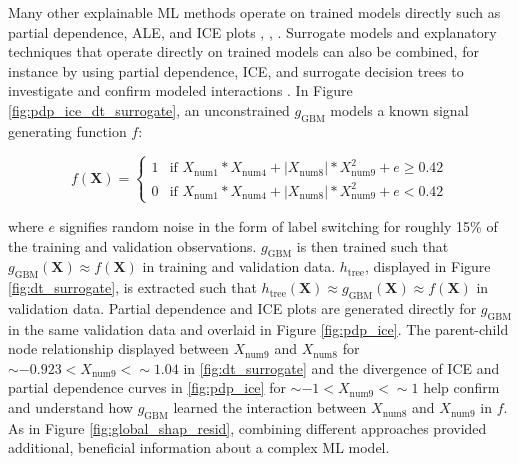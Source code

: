 \documentclass[sigconf]{acmart}
\newcommand{\twopartdef}[4]
{
	\left\{
		\begin{array}{ll}
			#1 & \mbox{if } #2 \\
			#3 & \mbox{if } #4
		\end{array}
	\right.
}
\begin{document}
Many other explainable ML methods operate on trained models directly such as partial dependence, ALE, and ICE plots \cite{ale_plot}, \cite{esl}, \cite{ice_plots}. Surrogate models and explanatory techniques that operate directly on trained models can also be combined, for instance by using partial dependence, ICE, and surrogate decision trees to investigate and confirm modeled interactions \cite{art_and_sci}. In Figure \ref{fig:pdp_ice_dt_surrogate}, an unconstrained $g_{\text{GBM}}$ models a known signal generating function $f$:

\begin{equation}
\label{eq:f}
f(\mathbf{X}) = \twopartdef {1} {X_{\text{num}1} * X_{\text{num}4} + |X_{\text{num}8}| * X_{\text{num}9}^2 + e \geq 0.42} {0} {X_{\text{num}1} * X_{\text{num}4} + |X_{\text{num}8}| * X_{\text{num}9}^2 + e < 0.42}
\end{equation}

\noindent where $e$ signifies random noise in the form of label switching for roughly 15\% of the training and validation observations. $g_{\text{GBM}}$ is then trained such that $g_{\text{GBM}}(\mathbf{X}) \approx f(\mathbf{X})$ in training and validation data. $h_{\text{tree}}$, displayed in Figure \ref{fig:dt_surrogate}, is extracted such that $h_{\text{tree}}(\mathbf{X}) \approx g_{\text{GBM}}(\mathbf{X}) \approx f(\mathbf{X})$ in validation data. Partial dependence and ICE plots are generated directly for $g_{\text{GBM}}$ in the same validation data and overlaid in Figure \ref{fig:pdp_ice}. The parent-child node relationship displayed between $X_{\text{num9}}$ and $X_{\text{num8}}$ for $\sim -0.923 < X_{\text{num9}} <  \sim 1.04$ in \ref{fig:dt_surrogate} and the divergence of ICE and partial dependence curves in \ref{fig:pdp_ice} for $\sim -1 < X_{\text{num9}} <  \sim 1$ help confirm and understand how $g_{\text{GBM}}$ learned the interaction between $X_{\text{num}8}$ and $X_{\text{num}9}$ in $f$. As in Figure \ref{fig:global_shap_resid}, combining different approaches provided additional, beneficial information about a complex ML model.
\end{document}
